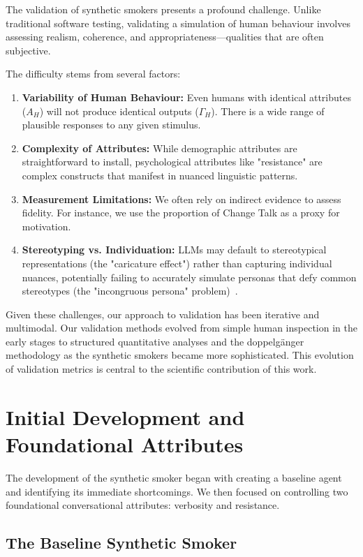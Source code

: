 The validation of synthetic smokers presents a profound challenge. Unlike traditional software testing, validating a simulation of human behaviour involves assessing realism, coherence, and appropriateness—qualities that are often subjective.

The difficulty stems from several factors:

\begin{enumerate}
    \item \textbf{Variability of Human Behaviour:} Even humans with identical attributes ($A_H$) will not produce identical outputs ($\Gamma_H$). There is a wide range of plausible responses to any given stimulus.
    \item \textbf{Complexity of Attributes:} While demographic attributes are straightforward to install, psychological attributes like "resistance" are complex constructs that manifest in nuanced linguistic patterns.
    \item \textbf{Measurement Limitations:} We often rely on indirect evidence to assess fidelity. For instance, we use the proportion of Change Talk as a proxy for motivation.
    \item \textbf{Stereotyping vs. Individuation:} LLMs may default to stereotypical representations (the "caricature effect") rather than capturing individual nuances, potentially failing to accurately simulate personas that defy common stereotypes (the "incongruous persona" problem)~\citep{liu2024evaluating}.
\end{enumerate}

Given these challenges, our approach to validation has been iterative and multimodal. Our validation methods evolved from simple human inspection in the early stages to structured quantitative analyses and the doppelgänger methodology as the synthetic smokers became more sophisticated. This evolution of validation metrics is central to the scientific contribution of this work.

\section{Initial Development and Foundational Attributes}
\label{sec:synthetic-smoker-foundational}

The development of the synthetic smoker began with creating a baseline agent and identifying its immediate shortcomings. We then focused on controlling two foundational conversational attributes: verbosity and resistance.

\subsection{The Baseline Synthetic Smoker}
\label{sec:synthetic-smoker-baseline}

